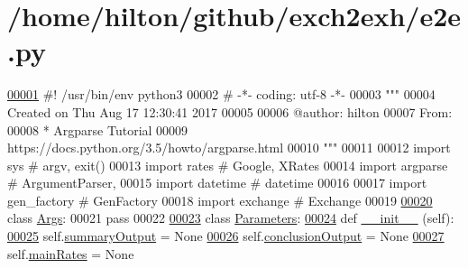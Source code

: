\hypertarget{e2e_8py_source}{}\section{/home/hilton/github/exch2exh/e2e.py}

\begin{DoxyCode}
\hypertarget{e2e_8py_source.tex_l00001}{}\hyperlink{namespacee2e}{00001} \textcolor{comment}{#! /usr/bin/env python3}
00002 \textcolor{comment}{# -*- coding: utf-8 -*-}
00003 \textcolor{stringliteral}{"""}
00004 \textcolor{stringliteral}{Created on Thu Aug 17 12:30:41 2017}
00005 \textcolor{stringliteral}{}
00006 \textcolor{stringliteral}{@author: hilton}
00007 \textcolor{stringliteral}{From:}
00008 \textcolor{stringliteral}{* Argparse Tutorial}
00009 \textcolor{stringliteral}{  https://docs.python.org/3.5/howto/argparse.html}
00010 \textcolor{stringliteral}{"""}
00011 
00012 \textcolor{keyword}{import} sys      \textcolor{comment}{# argv, exit()}
00013 \textcolor{keyword}{import} rates    \textcolor{comment}{# Google, XRates}
00014 \textcolor{keyword}{import} argparse \textcolor{comment}{# ArgumentParser, }
00015 \textcolor{keyword}{import} datetime \textcolor{comment}{# datetime}
00016 
00017 \textcolor{keyword}{import} gen\_factory \textcolor{comment}{# GenFactory}
00018 \textcolor{keyword}{import} exchange    \textcolor{comment}{# Exchange}
00019 
\hypertarget{e2e_8py_source.tex_l00020}{}\hyperlink{classe2e_1_1_args}{00020} \textcolor{keyword}{class }\hyperlink{classe2e_1_1_args}{Args}: 
00021     \textcolor{keywordflow}{pass}
00022 
\hypertarget{e2e_8py_source.tex_l00023}{}\hyperlink{classe2e_1_1_parameters}{00023} \textcolor{keyword}{class }\hyperlink{classe2e_1_1_parameters}{Parameters}:
\hypertarget{e2e_8py_source.tex_l00024}{}\hyperlink{classe2e_1_1_parameters_a335faddfa9af3ed8ac441e92faec0946}{00024}     \textcolor{keyword}{def }\hyperlink{classe2e_1_1_parameters_a335faddfa9af3ed8ac441e92faec0946}{\_\_init\_\_} (self):
\hypertarget{e2e_8py_source.tex_l00025}{}\hyperlink{classe2e_1_1_parameters_a1f4bab2e746d2c598e20ccba0154d795}{00025}         self.\hyperlink{classe2e_1_1_parameters_a1f4bab2e746d2c598e20ccba0154d795}{summaryOutput}        = \textcolor{keywordtype}{None}
\hypertarget{e2e_8py_source.tex_l00026}{}\hyperlink{classe2e_1_1_parameters_ad5967b78ebf5c8778e423413053015a7}{00026}         self.\hyperlink{classe2e_1_1_parameters_ad5967b78ebf5c8778e423413053015a7}{conclusionOutput}     = \textcolor{keywordtype}{None}
\hypertarget{e2e_8py_source.tex_l00027}{}\hyperlink{classe2e_1_1_parameters_aaa2b41d7017ab4893bbe27fa8edb7180}{00027}         self.\hyperlink{classe2e_1_1_parameters_aaa2b41d7017ab4893bbe27fa8edb7180}{mainRates}            = \textcolor{keywordtype}{None}

\end{DoxyCode}
